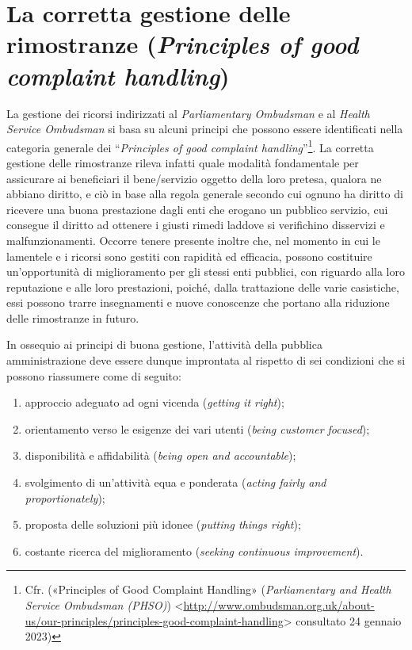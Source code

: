 \documentclass[12pt,it,a4paper,]{report}
\providecommand{\tightlist}{%
  \setlength{\itemsep}{0pt}\setlength{\parskip}{0pt}}
\begin{document}
\hypertarget{la-corretta-gestione-delle-rimostranze-principles-of-good-complaint-handling}{%
\section{\texorpdfstring{La corretta gestione delle rimostranze
(\emph{Principles of good complaint
handling})}{La corretta gestione delle rimostranze (Principles of good complaint handling)}}\label{la-corretta-gestione-delle-rimostranze-principles-of-good-complaint-handling}}

La gestione dei ricorsi indirizzati al \emph{Parliamentary Ombudsman} e
al \emph{Health Service Ombudsman} si basa su alcuni principi che
possono essere identificati nella categoria generale dei
``\emph{Principles of good complaint handling}''\footnote{Cfr.
  ({«Principles of Good Complaint Handling»} (\emph{Parliamentary and
  Health Service Ombudsman (PHSO)})
  \textless{}\url{http://www.ombudsman.org.uk/about-us/our-principles/principles-good-complaint-handling}\textgreater{}
  consultato 24 gennaio 2023)}. La corretta gestione delle rimostranze
rileva infatti quale modalità fondamentale per assicurare ai beneficiari
il bene/servizio oggetto della loro pretesa, qualora ne abbiano diritto,
e ciò in base alla regola generale secondo cui ognuno ha diritto di
ricevere una buona prestazione dagli enti che erogano un pubblico
servizio, cui consegue il diritto ad ottenere i giusti rimedi laddove si
verifichino disservizi e malfunzionamenti. Occorre tenere presente
inoltre che, nel momento in cui le lamentele e i ricorsi sono gestiti
con rapidità ed efficacia, possono costituire un'opportunità di
miglioramento per gli stessi enti pubblici, con riguardo alla loro
reputazione e alle loro prestazioni, poiché, dalla trattazione delle
varie casistiche, essi possono trarre insegnamenti e nuove conoscenze
che portano alla riduzione delle rimostranze in futuro.

In ossequio ai principi di buona gestione, l'attività della pubblica
amministrazione deve essere dunque improntata al rispetto di sei
condizioni che si possono riassumere come di seguito:

\begin{enumerate}
\def\labelenumi{\arabic{enumi})}
\tightlist
\item
  approccio adeguato ad ogni vicenda (\emph{getting it right});
\item
  orientamento verso le esigenze dei vari utenti (\emph{being customer
  focused});
\item
  disponibilità e affidabilità (\emph{being open and accountable});
\item
  svolgimento di un'attività equa e ponderata (\emph{acting fairly and
  proportionately});
\item
  proposta delle soluzioni più idonee (\emph{putting things right});
\item
  costante ricerca del miglioramento (\emph{seeking continuous
  improvement}).
\end{enumerate}
\end{document}
